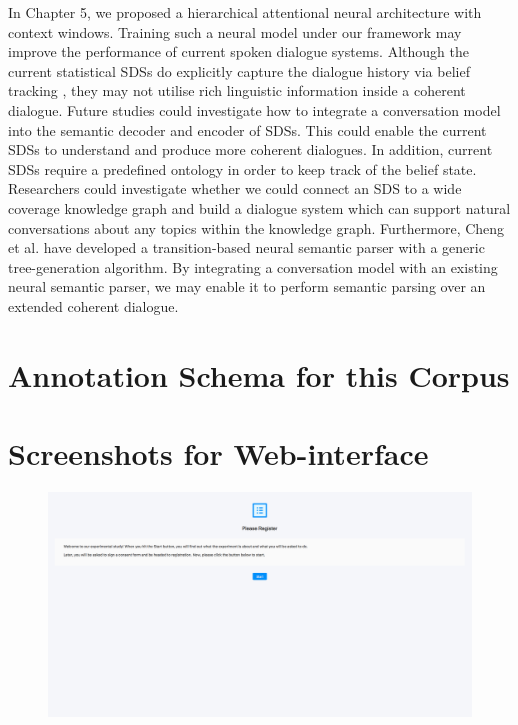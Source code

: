 \documentclass[bsc,frontabs,twoside,singlespacing,parskip,deptreport]{infthesis}     %
\begin{document}
In Chapter 5, we proposed a hierarchical attentional neural architecture with context windows. Training such a neural model under our framework may improve the performance of current spoken dialogue systems. Although the current statistical SDSs do explicitly capture the dialogue history via belief tracking \cite{gasic}, they may not utilise rich linguistic information inside a coherent dialogue. Future studies could investigate how to integrate a conversation model into the semantic decoder and encoder of SDSs. This could enable the current SDSs to understand and produce more coherent dialogues. In addition, current SDSs require a predefined ontology in order to keep track of the belief state. Researchers could investigate whether we could connect an SDS to a wide coverage knowledge graph and build a dialogue system which can support natural conversations about any topics within the knowledge graph. Furthermore, Cheng et al. \cite{cheng2019learning} have developed a transition-based neural semantic parser with a generic tree-generation algorithm. By integrating a conversation model with an existing neural semantic parser, we may enable it to perform semantic parsing over an extended coherent dialogue.




%





\appendix
\chapter{Annotation Schema for this Corpus}
\label{appendix:annotation}


\chapter{Screenshots for Web-interface}
\label{fig:interface}

\begin{figure}[h]
    \centering
    \includegraphics[width=\textwidth]{regi.png}
    
    
    \label{fig:regi}
\end{figure}
\end{document}
